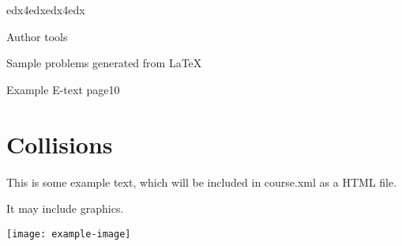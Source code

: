 \documentclass[12pt]{article}
\begin{document}
\begin{edXcourse}{edx4edx}{edx4edx}

\begin{edXchapter}{Author tools}

\begin{edXsection}{Sample problems generated from LaTeX}

\begin{edXsequential}

\begin{edXproblem}{Example E-text page}{10}

\section{Collisions}

This is some example text, which will be included in course.xml as a
HTML file.

It may include graphics.

\texttt{[image: example-image]}

\end{edXproblem}


\end{edXsequential}

\end{edXsection}
\end{edXchapter}
\end{edXcourse}
\end{document}
